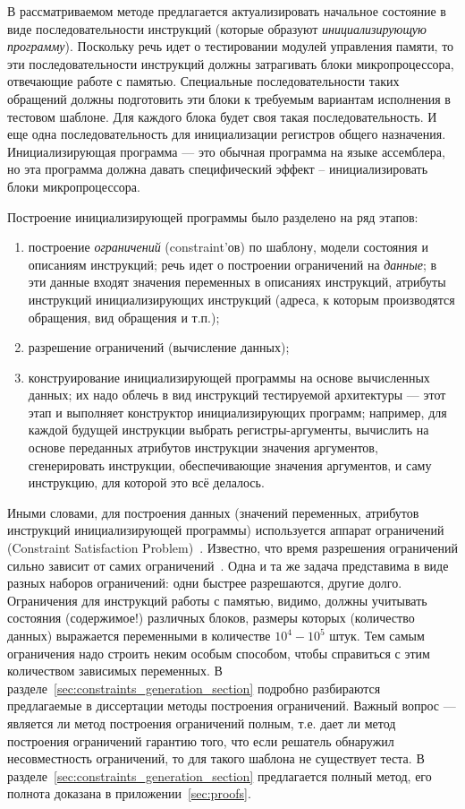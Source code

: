 В рассматриваемом методе предлагается актуализировать начальное состояние в виде последовательности инструкций (которые образуют \emph{инициализирующую программу}). Поскольку речь идет о тестировании модулей управления памяти, то эти последовательности инструкций должны затрагивать блоки микропроцессора, отвечающие работе с памятью. Специальные последовательности таких обращений должны подготовить эти блоки к требуемым вариантам исполнения в тестовом шаблоне. Для каждого блока будет своя такая последовательность. И еще одна последовательность для инициализации регистров общего назначения. Инициализирующая программа --- это обычная программа на языке ассемблера, но эта программа должна давать специфический эффект -- инициализировать блоки микропроцессора.

Построение инициализирующей программы было разделено на ряд этапов:
\begin{enumerate}
  \item построение \emph{ограничений} (constraint'ов) по шаблону, модели
состояния и описаниям инструкций; речь идет о построении ограничений на
\emph{данные}; в эти данные входят значения переменных в описаниях инструкций, атрибуты инструкций инициализирующих инструкций (адреса, к которым производятся обращения, вид обращения и т.п.);
  \item разрешение ограничений (вычисление данных);
  \item конструирование инициализирующей программы на основе вычисленных данных; их надо облечь в вид инструкций тестируемой архитектуры --- этот этап и выполняет конструктор инициализирующих программ; например, для каждой будущей инструкции выбрать регистры-аргументы, вычислить на основе переданных атрибутов инструкции значения аргументов, сгенерировать инструкции, обеспечивающие значения аргументов, и саму инструкцию, для которой это всё делалось.
\end{enumerate}

Иными словами, для построения данных (значений переменных, атрибутов инструкций инициализирующей программы) используется аппарат ограничений (Constraint Satisfaction Problem)~\cite{CSP}. Известно, что время разрешения ограничений сильно зависит от самих ограничений~\cite{isaac05balanced}. Одна и та же задача представима в виде разных наборов ограничений: одни быстрее
разрешаются, другие долго. Ограничения для инструкций работы с памятью, видимо, должны учитывать состояния (содержимое!) различных блоков, размеры которых (количество данных) выражается переменными в количестве $10^4-10^5$ штук. Тем самым ограничения надо строить неким особым способом, чтобы справиться с этим количеством зависимых переменных. В разделе~\ref{sec:constraints_generation_section}
подробно разбираются предлагаемые в диссертации методы построения ограничений. Важный вопрос --- является ли метод построения ограничений полным, т.е. дает ли метод построения ограничений гарантию того, что если решатель обнаружил несовместность ограничений, то для такого шаблона не существует теста. В разделе~\ref{sec:constraints_generation_section} предлагается полный метод, его полнота доказана в приложении~\ref{sec:proofs}.

